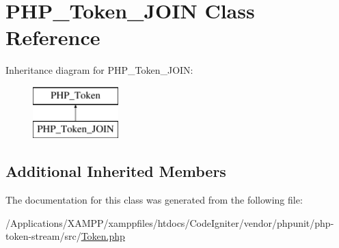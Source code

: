 \hypertarget{class_p_h_p___token___j_o_i_n}{}\section{P\+H\+P\+\_\+\+Token\+\_\+\+J\+O\+IN Class Reference}
\label{class_p_h_p___token___j_o_i_n}
Inheritance diagram for P\+H\+P\+\_\+\+Token\+\_\+\+J\+O\+IN\+:\begin{figure}[H]
\begin{center}
\leavevmode
\includegraphics[height=2.000000cm]{class_p_h_p___token___j_o_i_n}
\end{center}
\end{figure}
\subsection*{Additional Inherited Members}


The documentation for this class was generated from the following file\+:\begin{DoxyCompactItemize}
\item 
/\+Applications/\+X\+A\+M\+P\+P/xamppfiles/htdocs/\+Code\+Igniter/vendor/phpunit/php-\/token-\/stream/src/\mbox{\hyperlink{_token_8php}{Token.\+php}}\end{DoxyCompactItemize}
